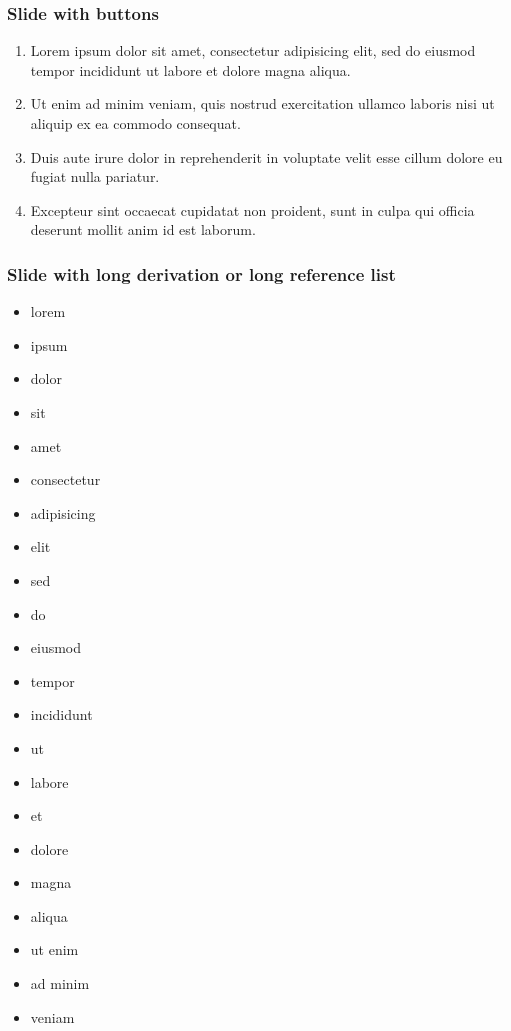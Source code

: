 \documentclass[11pt,xcolor={dvipsnames},hyperref={pdftex,pdfpagemode=UseNone,hidelinks,pdfdisplaydoctitle=true},usepdftitle=false]{beamer}
\begin{document}
\begin{frame}
\end{frame}


\begin{frame}[label=firstSlide]
\frametitle{Slide with buttons}
\begin{enumerate}
\item Lorem ipsum dolor sit amet, consectetur adipisicing elit, sed do eiusmod
tempor incididunt ut labore et dolore magna aliqua.
\item  Ut enim ad minim veniam, quis nostrud exercitation ullamco laboris nisi ut aliquip ex ea commodo consequat. 
\item Duis aute irure dolor in reprehenderit in voluptate velit esse
cillum dolore eu fugiat nulla pariatur. 
\item Excepteur sint occaecat cupidatat non proident, sunt in culpa qui officia deserunt mollit anim id est laborum.
\end{enumerate}
\hyperlink{backupSlide}{}
\hyperlink{anotherBackupSlide}{}
\end{frame}

\begin{frame}[allowframebreaks=0.8]
\frametitle{Slide with long derivation or long reference list}
\begin{itemize}
\item lorem 
\item ipsum 
\item dolor 
\item sit 
\item amet
\item consectetur 
\item adipisicing 
\item elit
\item sed
\item do
\item eiusmod
\item tempor
\item incididunt
\item ut
\item labore
\item et 
\item dolore 
\item magna 
\item aliqua
\item ut enim
\item ad minim 
\item veniam
\end{itemize}
\end{frame}
\end{document}
